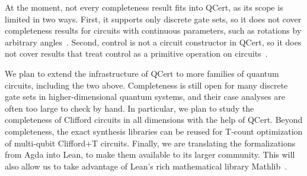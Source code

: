 \documentclass[acmsmall,nonacm,11pt,screen]{acmart}
\begin{document}
At the moment, not every completeness result fits into QCert, as its scope is limited in two ways. First, it supports only discrete gate sets, so it does not cover completeness results for circuits with continuous parameters, such as rotations by arbitrary angles~\cite{clement2023complete,clement2024extensions,clement2024minimal}. Second, control is not a circuit constructor in QCert, so it does not cover results that treat control as a primitive operation on circuits~\cite{delorme2026control,schober2026control,blake2026qudit}.

We plan to extend the infrastructure of QCert to more families of quantum circuits, including the two above. Completeness is still open for many discrete gate sets in higher-dimensional quantum systems, and their case analyses are often too large to check by hand. In particular, we plan to study the completeness of Clifford circuits in all dimensions with the help of QCert. Beyond completeness, the exact synthesis libraries can be reused for T-count optimization of multi-qubit Clifford+T circuits. Finally, we are translating the formalizations from Agda into Lean, to make them available to its larger community. This will also allow us to take advantage of Lean's rich mathematical library Mathlib~\cite{mathlib2020}.




\end{document}
